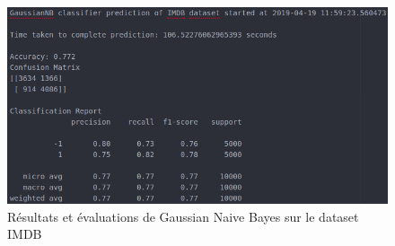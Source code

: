 \documentclass[12pt,a4paper]{report}
\theoremstyle{definition}
\begin{document}
\begin{appendices}
\begin{figure}[!ht]
  \centering
  \includegraphics[scale=0.5]{images/snapshots/predictions/gaussian_naive_bayes/imdb_dataset_results.png}
  \caption{Résultats et évaluations de Gaussian Naive Bayes sur le dataset IMDB}
  \label{fig:gnb_imdb_dataset}
\end{figure}

\end{appendices}
\end{document}
